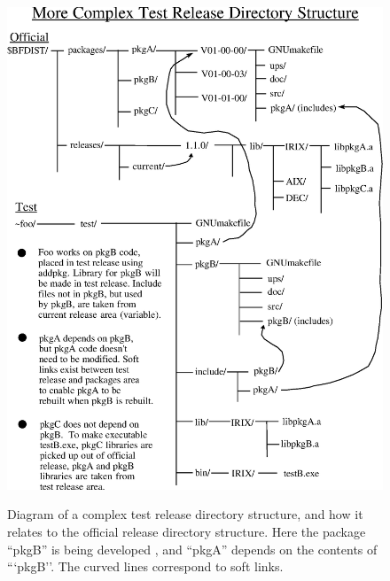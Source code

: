 \documentclass[12pt]{article}
\begin{document}
\vspace*{1.0in}
\begin{figure}[bht!]
\centerline{\includegraphics[width=5in]{run_2_development.eps}}
\caption[Complex Test Release Directory Structure]{ 
Diagram of a complex test release directory structure, and how it relates to the
official release directory structure.  Here the package ``pkgB'' is being
developed , and ``pkgA'' depends on the contents of ```pkgB''. The curved lines 
correspond to soft links.}
\label{fig_testrel}
\end{figure}
\clearpage 






\end{document}
